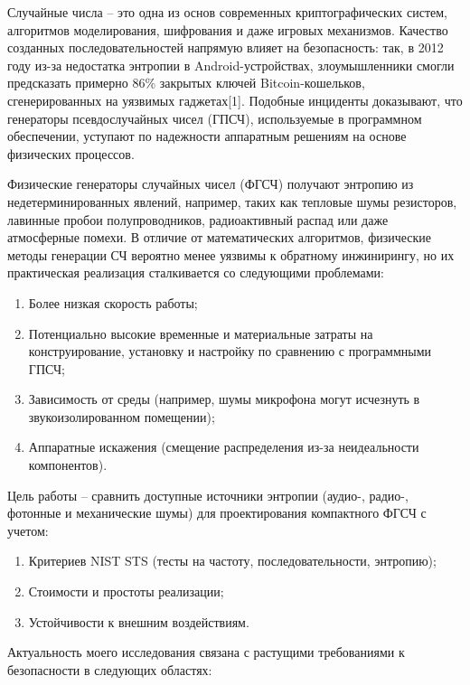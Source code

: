 \clearpage
\onehalfspacing


Случайные числа -- это одна из основ современных криптографических
систем, алгоритмов моделирования, шифрования и даже игровых механизмов.
Качество созданных последовательностей напрямую влияет на безопасность:
так, в 2012 году из-за недостатка энтропии в Android-устройствах,
злоумышленники смогли предсказать примерно 86\% закрытых ключей
Bitcoin-кошельков, сгенерированных на уязвимых гаджетах{[}1{]}. Подобные
инциденты доказывают, что генераторы псевдослучайных чисел (ГПСЧ),
используемые в программном обеспечении, уступают по надежности
аппаратным решениям на основе физических процессов.

Физические генераторы случайных чисел (ФГСЧ) получают энтропию из
недетерминированных явлений, например, таких как тепловые шумы
резисторов, лавинные пробои полупроводников, радиоактивный распад или
даже атмосферные помехи. В отличие от математических алгоритмов,
физические методы генерации СЧ вероятно менее уязвимы к обратному
инжинирингу, но их практическая реализация сталкивается со следующими
проблемами:

\begin{enumerate}
\def\labelenumi{\arabic{enumi}.}
\item
  Более низкая скорость работы;
\item
  Потенциально высокие временные и материальные затраты на
  конструирование, установку и настройку по сравнению с программными
  ГПСЧ;
\item
  Зависимость от среды (например, шумы микрофона могут исчезнуть в
  звукоизолированном помещении);
\item
  Аппаратные искажения (смещение распределения из-за неидеальности
  компонентов).
\end{enumerate}

Цель работы -- сравнить доступные источники энтропии (аудио-, радио-,
фотонные и механические шумы) для проектирования компактного ФГСЧ с
учетом:

\begin{enumerate}
\def\labelenumi{\arabic{enumi}.}
\item
  Критериев NIST STS (тесты на частоту, последовательности, энтропию);
\item
  Стоимости и простоты реализации;
\item
  Устойчивости к внешним воздействиям.
\end{enumerate}

Актуальность моего исследования связана с растущими требованиями к
безопасности в следующих областях:

